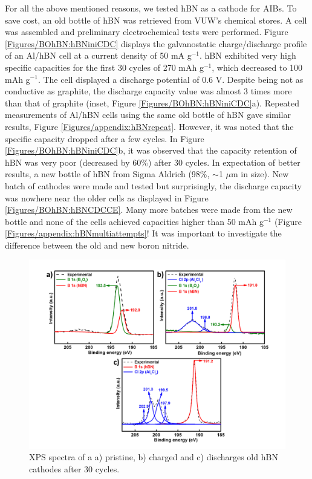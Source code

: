 For all the above mentioned reasons, we tested hBN as a cathode for AIBs. To save cost, an old bottle of hBN was retrieved from VUW's chemical stores. A cell was assembled and preliminary electrochemical tests were performed. Figure \ref{Figures/BOhBN:hBNiniCDC} displays the galvanostatic charge/discharge profile of an Al/hBN cell at a current density of 50 mA g$^{-1}$. hBN exhibited very high specific capacities for the first 30 cycles of 270 mAh g$^{-1}$, which decreased to 100 mAh g$^{-1}$. The cell displayed a discharge potential of 0.6 V. Despite being not as conductive as graphite, the discharge capacity value was almost 3 times more than that of graphite (inset, Figure \ref{Figures/BOhBN:hBNiniCDC}a). Repeated measurements of Al/hBN cells using the same old bottle of hBN gave similar results, Figure \ref{Figures/appendix:hBNrepeat}. However, it was noted that the specific capacity dropped after a few cycles. In Figure \ref{Figures/BOhBN:hBNiniCDC}b, it was observed that the capacity retention of hBN was very poor (decreased by 60\%) after 30 cycles. In expectation of better results, a new bottle of hBN from Sigma Aldrich (98\%, $\sim$1 $\mu$m in size). New batch of cathodes were made and tested but surprisingly, the discharge capacity was nowhere near the older cells as displayed in Figure \ref{Figures/BOhBN:hBNCDCCE}. Many more batches were made from the new bottle and none of the cells achieved capacities higher than 50 mAh g$^{-1}$ (Figure \ref{Figures/appendix:hBNmultiattempts}! 
It was important to investigate the difference between the old and new boron nitride.

\begin{figure}[tbh!]
\centering
\includegraphics[width=\textwidth]{Figures/BOhBN/oldhBNXPS}
\caption{XPS spectra of a a) pristine, b) charged and c) discharges old hBN cathodes after 30 cycles.}
\label{Figures/BOhBN:oldhBNXPS}
\end{figure}

